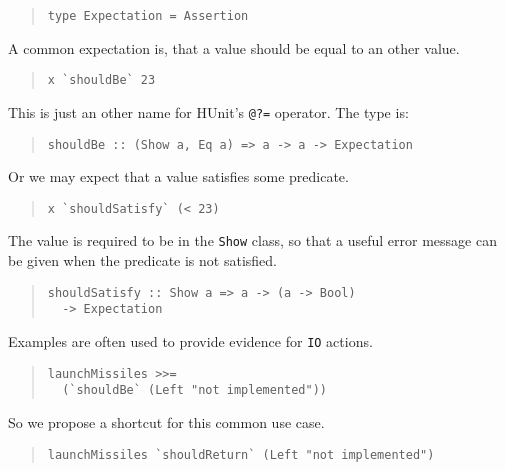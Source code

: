 \documentclass[preprint]{sigplanconf}
\begin{document}
\begin{quote}\small\begin{verbatim}
type Expectation = Assertion
\end{verbatim}\end{quote}

\noindent A common expectation is, that a value should be equal to an other
value.

\begin{quote}\small\begin{verbatim}
x `shouldBe` 23
\end{verbatim}\end{quote}

\noindent This is just an other name for HUnit's \texttt{@?=}
operator.  The type is:

\begin{quote}\small\begin{verbatim}
shouldBe :: (Show a, Eq a) => a -> a -> Expectation
\end{verbatim}\end{quote}

\noindent Or we may expect that a value satisfies some predicate.

\begin{quote}\small\begin{verbatim}
x `shouldSatisfy` (< 23)
\end{verbatim}\end{quote}

\noindent The value is required to be in the \texttt{Show} class, so that a
useful error message can be given when the predicate is not satisfied.

\begin{quote}\small\begin{verbatim}
shouldSatisfy :: Show a => a -> (a -> Bool)
  -> Expectation
\end{verbatim}\end{quote}

\noindent Examples are often used to provide evidence for {\tt IO}
actions.

\begin{quote}\small\begin{verbatim}
launchMissiles >>=
  (`shouldBe` (Left "not implemented"))
\end{verbatim}\end{quote}

\noindent So we propose a shortcut for this common use case.

\begin{quote}\small\begin{verbatim}
launchMissiles `shouldReturn` (Left "not implemented")
\end{verbatim}\end{quote}
\end{document}
